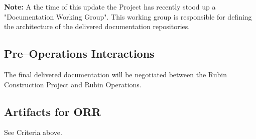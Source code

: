 {\bf Note:} A the time of this update the Project has recently stood up a "Documentation Working Group".  This working group is responsible for defining the architecture of the delivered documentation repositories.

\subsection{Pre--Operations Interactions}

The final delivered documentation will be negotiated between the Rubin Construction Project and Rubin Operations.

\subsection{Artifacts for ORR}

See Criteria above.
